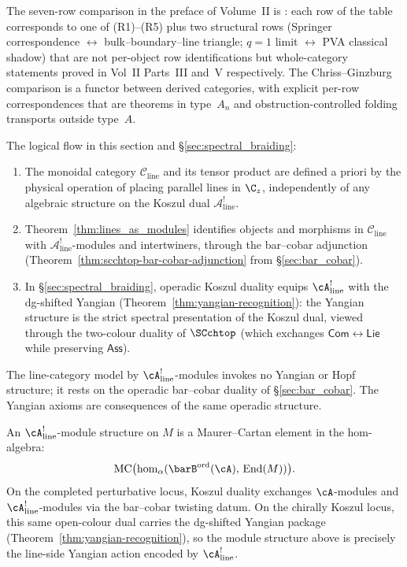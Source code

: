 \begin{remark}
\label{rem:cg-preface-table-upgraded}
The seven-row comparison in the preface of Volume~II is
: each row of
the table corresponds to one of (R1)--(R5) plus two
structural rows (Springer correspondence $\leftrightarrow$
bulk--boundary--line triangle; $q=1$ limit $\leftrightarrow$
PVA classical shadow) that are not per-object row
identifications but whole-category statements proved in
Vol~II Parts~III and~V respectively. The Chriss--Ginzburg
comparison is a functor between
derived categories, with explicit per-row correspondences
that are theorems in type~$A_n$ and obstruction-controlled
folding transports outside type~$A$.
\end{remark}

\begin{remark}
\label{rmk:line-op-logic}
The logical flow in this section and \S\ref{sec:spectral_braiding}:
\begin{enumerate}
\item The monoidal category $\mathcal{C}_{\mathrm{line}}$
 and its tensor product are defined a priori by the
 physical operation of placing parallel lines in $\C_z$,
 independently of any algebraic structure on the Koszul
 dual $\mathcal{A}^!_{\mathrm{line}}$.
\item Theorem~\ref{thm:lines_as_modules} identifies objects
 and morphisms in $\mathcal{C}_{\mathrm{line}}$ with
 $\mathcal{A}^!_{\mathrm{line}}$-modules and intertwiners, through
 the bar--cobar adjunction
 (Theorem~\ref{thm:scchtop-bar-cobar-adjunction} from
 \S\ref{sec:bar_cobar}).
\item In \S\ref{sec:spectral_braiding}, operadic Koszul
 duality equips $\cA^!_{\mathrm{line}}$ with the dg-shifted Yangian
 (Theorem~\ref{thm:yangian-recognition}): the Yangian structure is
 the strict spectral presentation of the Koszul dual, viewed
 through the two-colour duality of $\SCchtop$ (which exchanges
 $\mathsf{Com} \leftrightarrow \mathsf{Lie}$ while preserving
 $\mathsf{Ass}$).
\end{enumerate}
The line-category model by $\cA^!_{\mathrm{line}}$-modules invokes no
Yangian or Hopf structure; it rests on the operadic bar--cobar
duality of \S\ref{sec:bar_cobar}. The Yangian axioms are consequences
of the same operadic structure.
\end{remark}

\begin{construction}
\label{constr:vol2-line-operators-mc}
An $\cA^!_{\mathrm{line}}$-module structure on $M$ is a Maurer--Cartan element in the hom-algebra:
\[
\mathrm{MC}\bigl(\mathrm{hom}_\alpha(\barB^{\mathrm{ord}}(\cA),\, \operatorname{End}(M))\bigr).
\]
On the completed perturbative locus, Koszul duality exchanges
$\cA$-modules and $\cA^!_{\mathrm{line}}$-modules via the bar--cobar
twisting datum. On the chirally Koszul locus, this same open-colour
dual carries the dg-shifted Yangian package
(Theorem~\ref{thm:yangian-recognition}), so the module structure above
is precisely the line-side Yangian action encoded by
$\cA^!_{\mathrm{line}}$.
\end{construction}

